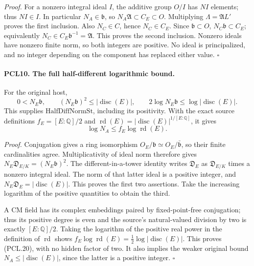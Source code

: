 \emph{Proof.}
For a nonzero integral ideal \(I\), the additive group
\(O/I\) has \(NI\) elements; thus \(NI\in I\).
In particular \(N_A\in\mathfrak b\), so
\(N_A\mathfrak A\subset C_E\subset O\).  Multiplying
\(\Lambda=\mathfrak A L'\) proves the first inclusion.
Also \(N_C\in C\), hence \(N_C\in C_E\).
Since \(\mathfrak b\subset O\),
\(N_C\mathfrak b\subset C_E\); equivalently
\(N_C\in C_E\mathfrak b^{-1}=\mathfrak A\).
This proves the second inclusion.  Nonzero ideals have
nonzero finite norm, so both integers are positive.
No ideal is principalized, and no integer depending on
the component has replaced either value.
\hfill\(\square\)

\paragraph{PCL10. The full half-different logarithmic bound.}
\label{claim:PCL10}
For the original host,
\[
 0<N_E\mathfrak b,\qquad
 (N_E\mathfrak b)^2\le|\operatorname{disc}(E)|,
 \qquad
 2\log N_E\mathfrak b\le\log|\operatorname{disc}(E)|.
                                                               \tag{PCL.19}
\]
This supplies \(\mathrm{HalfDiffNormSt}\), including its
positivity.  With the exact source definitions
\(f_E=[E:\mathbb Q]/2\) and
\(\operatorname{rd}(E)=|\operatorname{disc}(E)|^{1/[E:\mathbb Q]}\),
it gives
\[
        \log N_A\le f_E\log\operatorname{rd}(E).     \tag{PCL.20}
\]

\emph{Proof.}
Conjugation gives a ring isomorphism
\(O_E/\mathfrak b\simeq O_E/\bar{\mathfrak b}\), so their
finite cardinalities agree.  Multiplicativity of ideal
norm therefore gives
\(N_E\mathfrak D_{E/K}=(N_E\mathfrak b)^2\).
The different-in-a-tower identity writes
\(\mathfrak D_E\) as \(\mathfrak D_{E/K}\) times a
nonzero integral ideal.  The norm of that latter ideal
is a positive integer, and
\(N_E\mathfrak D_E=|\operatorname{disc}(E)|\).  This
proves the first two assertions.  Take the increasing
logarithm of the positive quantities to obtain the third.

A CM field has its complex embeddings paired by
fixed-point-free conjugation; thus its positive degree
is even and the source's natural-valued division by two
is exactly \([E:\mathbb Q]/2\).  Taking the logarithm
of the positive real power in the definition of
\(\operatorname{rd}\) shows
\(f_E\log\operatorname{rd}(E)=\tfrac12\log|\operatorname{disc}(E)|\).
This proves (PCL.20), with no hidden factor of two.
It also implies the weaker original bound
\(N_A\le|\operatorname{disc}(E)|\), since the latter
is a positive integer.
\hfill\(\square\)


